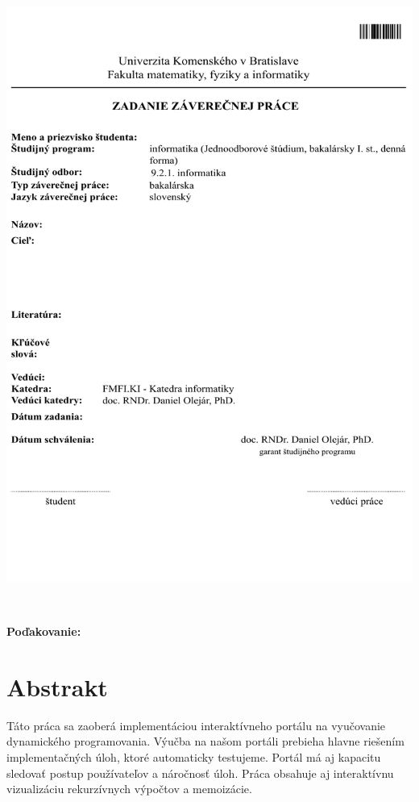 \documentclass[12pt, oneside]{book}
\begin{document}
\newpage
\thispagestyle{empty}
\hspace{-2cm}\includegraphics[width=1.1\textwidth]{images/zadanie}


\frontmatter

\setcounter{page}{3}
\newpage
~

\vfill
{\bf Poďakovanie:}


\newpage
\section*{Abstrakt}
Táto práca sa zaoberá implementáciou interaktívneho portálu na vyučovanie
dynamického programovania. Výučba na našom portáli prebieha hlavne riešením
implementačných úloh, ktoré automaticky testujeme. Portál má aj kapacitu
sledovať postup používateľov a náročnosť úloh. Práca obsahuje aj
interaktívnu vizualizáciu rekurzívnych výpočtov a memoizácie.
\end{document}
